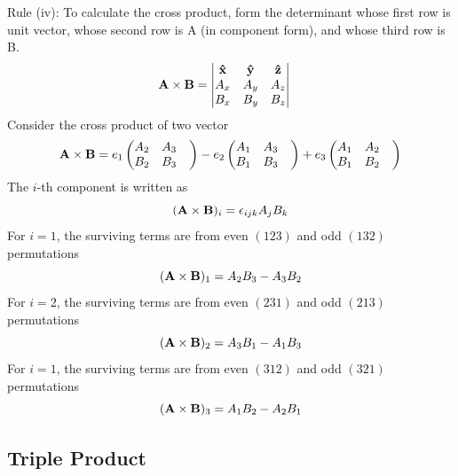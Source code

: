 \documentclass[../../../main.tex]{subfiles}
\begin{document}
Rule (iv): To calculate the cross product, form the determinant whose first row is unit vector, whose second row is A (in component form), and whose third row is B.
\begin{align*}
    \mathbf{A}\times \mathbf{B} & =
    \begin{vmatrix}
        \mathbf{\hat{x}} & \mathbf{\hat{y}} & \mathbf{\hat{z}} \\
        A_x              & A_y              & A_z              \\
        B_x              & B_y              & B_z
    \end{vmatrix}
\end{align*}
Consider the cross product of two vector
\begin{equation*}
    \mathbf{A} \times \mathbf{B} = e_1
    \begin{pmatrix}
        A_2 & A_3 & \\
        B_2 & B_3 &
    \end{pmatrix}
    - e_2
    \begin{pmatrix}
        A_1 & A_3 & \\
        B_1 & B_3 &
    \end{pmatrix}
    + e_3
    \begin{pmatrix}
        A_1 & A_2 & \\
        B_1 & B_2 &
    \end{pmatrix}
\end{equation*}
The $i$-th component is written as
\begin{equation*}
    (\mathbf{A} \times \mathbf{B})_i = \epsilon_{ijk} A_j B_k
\end{equation*}
For $i=1$, the surviving terms are from even $(123)$ and odd $(132)$ permutations
\begin{equation*}
    (\mathbf{A} \times \mathbf{B})_1 = A_2B_3 - A_3B_2
\end{equation*}
For $i=2$, the surviving terms are from even $(231)$ and odd $(213)$ permutations
\begin{equation*}
    (\mathbf{A} \times \mathbf{B})_2 = A_3B_1 - A_1B_3
\end{equation*}
For $i=1$, the surviving terms are from even $(312)$ and odd $(321)$ permutations
\begin{equation*}
    (\mathbf{A} \times \mathbf{B})_3 = A_1B_2 - A_2B_1
\end{equation*}


\subsection{Triple Product}
\end{document}

